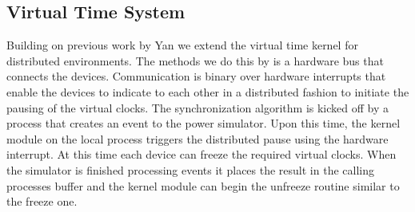 \subsection{Virtual Time System}
Building on previous work by Yan \cite{Yan:VTS:pads15} we extend the virtual time kernel for distributed environments. The methods we do this by is a hardware bus that connects the devices. Communication is binary over hardware interrupts that enable the devices to indicate to each other in a distributed fashion to initiate the pausing of the virtual clocks. The synchronization algorithm is kicked off by a process that creates an event to the power simulator. Upon this time, the kernel module on the local process triggers the distributed pause using the hardware interrupt. At this time each device can freeze the required virtual clocks. When the simulator is finished processing events it places the result in the calling processes buffer and the kernel module can begin the unfreeze routine similar to the freeze one.
